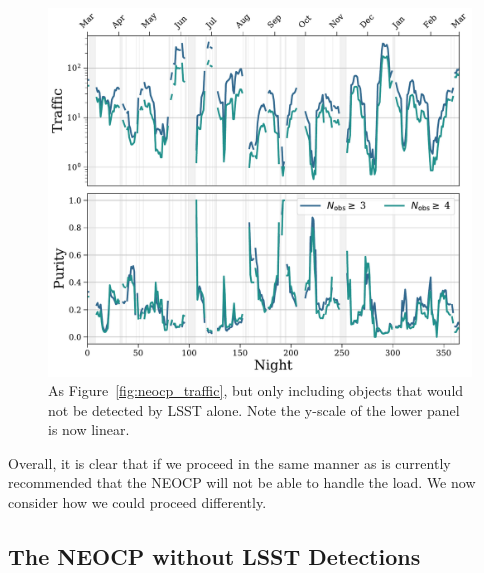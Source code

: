 \documentclass[twocolumn]{aastex631}
\begin{document}
\begin{figure}
    \centering
    \includegraphics[width=\textwidth]{traffic_purity_unfindable.pdf}
    \caption{As Figure~\ref{fig:neocp_traffic}, but only including objects that would not be detected by LSST alone. Note the y-scale of the lower panel is now linear.}
    \label{fig:neocp_traffic_unfindable}
\end{figure}

Overall, it is clear that if we proceed in the same manner as is currently recommended that the NEOCP will not be able to handle the load. We now consider how we could proceed differently.

\subsection{The NEOCP without LSST Detections}\label{sec:no_LSST_detections}
\end{document}
